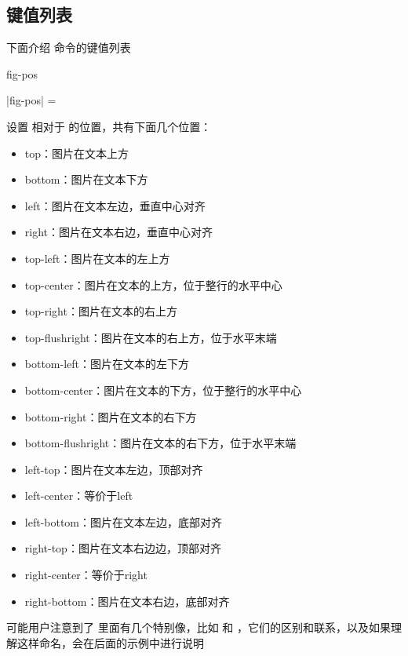 \documentclass{l3doc}
\begin{document}
\subsection{键值列表}
下面介绍  命令的键值列表
\begin{function}[added = 2022-01-22, updated = 2022-01-26]{fig-pos}
  \begin{syntax}
    |fig-pos| =  
  \end{syntax}
  设置  相对于 的位置，共有下面几个位置：
    \begin{itemize}
      \item top：图片在文本上方
      \item bottom：图片在文本下方
      \item left：图片在文本左边，垂直中心对齐
      \item right：图片在文本右边，垂直中心对齐
      \item top-left：图片在文本的左上方
      \item top-center：图片在文本的上方，位于整行的水平中心
      \item top-right：图片在文本的右上方
      \item top-flushright：图片在文本的右上方，位于水平末端
      \item bottom-left：图片在文本的左下方
      \item bottom-center：图片在文本的下方，位于整行的水平中心
      \item bottom-right：图片在文本的右下方
      \item bottom-flushright：图片在文本的右下方，位于水平末端
      \item left-top：图片在文本左边，顶部对齐
      \item left-center：等价于left
      \item left-bottom：图片在文本左边，底部对齐
      \item right-top：图片在文本右边边，顶部对齐
      \item right-center：等价于right
      \item right-bottom：图片在文本右边，底部对齐
    \end{itemize}
  可能用户注意到了  里面有几个特别像，比如  和 ，它们的区别和联系，以及如果理解这样命名，会在后面的示例中进行说明
\end{function}
\end{document}
